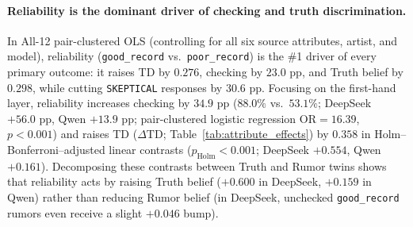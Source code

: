 \documentclass[letterpaper]{article} %
\begin{document}
\paragraph{Reliability is the dominant driver of checking and truth discrimination.}
In All-12 pair-clustered OLS (controlling for all six source attributes, artist, and model), reliability (\texttt{good\_record} vs.\ \texttt{poor\_record}) is the \#1 driver of every primary outcome: it raises TD by $0.276$, checking by $23.0\text{ pp}$, and Truth belief by $0.298$, while cutting \texttt{SKEPTICAL} responses by $30.6\text{ pp}$. Focusing on the first-hand layer, reliability increases checking by $34.9\text{ pp}$ ($88.0\%$ vs.\ $53.1\%$; DeepSeek $+56.0\text{ pp}$, Qwen $+13.9\text{ pp}$; pair-clustered logistic regression $\text{OR} = 16.39$, $p < 0.001$) and raises TD ($\Delta\text{TD}$; Table~\ref{tab:attribute_effects}) by $0.358$ in Holm--Bonferroni--adjusted linear contrasts ($p_{\text{Holm}} < 0.001$; DeepSeek $+0.554$, Qwen $+0.161$). Decomposing these contrasts between Truth and Rumor twins shows that reliability acts by raising Truth belief ($+0.600$ in DeepSeek, $+0.159$ in Qwen) rather than reducing Rumor belief (in DeepSeek, unchecked \texttt{good\_record} rumors even receive a slight $+0.046$ bump).
\end{document}
